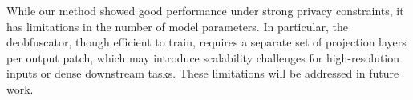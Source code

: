 \documentclass{ieeeaccess}
\begin{document}
While our method showed good performance under strong privacy constraints, it has limitations in the number of model parameters. In particular, the deobfuscator, though efficient to train, requires a separate set of projection layers per output patch, which may introduce scalability challenges for high-resolution inputs or dense downstream tasks. These limitations will be addressed in future work.














\end{document}
